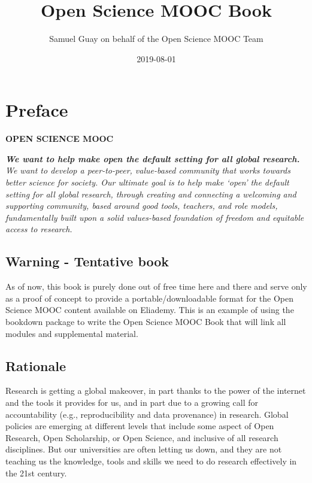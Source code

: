 \documentclass[]{book}
\title{Open Science MOOC Book}
\author{Samuel Guay on behalf of the Open Science MOOC Team}
\date{2019-08-01}
\begin{document}
\maketitle

{
\setcounter{tocdepth}{1}
\tableofcontents
}
\hypertarget{preface}{%
\chapter*{Preface}\label{preface}}

\textbf{OPEN SCIENCE MOOC}

\textbf{\emph{We want to help make open the default setting for all global research.}} \emph{We want to develop a peer-to-peer, value-based community that works towards better science for society. Our ultimate goal is to help make `open' the default setting for all global research, through creating and connecting a welcoming and supporting community, based around good tools, teachers, and role models, fundamentally built upon a solid values-based foundation of freedom and equitable access to research.}

\hypertarget{warning---tentative-book}{%
\section*{Warning - Tentative book}\label{warning---tentative-book}}

As of now, this book is purely done out of free time here and there and serve only as a proof of concept to provide a portable/downloadable format for the Open Science MOOC content available on Eliademy. This is an example of using the bookdown package to write the Open Science MOOC Book that will link all modules and supplemental material.

\hypertarget{rationale}{%
\section*{Rationale}\label{rationale}}

Research is getting a global makeover, in part thanks to the power of the internet and the tools it provides for us, and in part due to a growing call for accountability (e.g., reproducibility and data provenance) in research. Global policies are emerging at different levels that include some aspect of Open Research, Open Scholarship, or Open Science, and inclusive of all research disciplines. But our universities are often letting us down, and they are not teaching us the knowledge, tools and skills we need to do research effectively in the 21st century.
\end{document}
